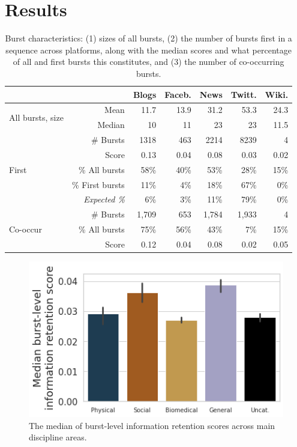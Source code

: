 \documentclass[letterpaper]{article} %
\begin{document}
\section{Results}

\begin{table}[t]
\centering
\begin{tabular}{@{}l |r | r r r r r @{}}
& & Blogs & Faceb. & News & Twitt. & Wiki. \\
\hline
\multirow{2}{7em}{All bursts, size} & Mean & 11.7 & 13.9 & 31.2 & 53.3 & 24.3 \\
& Median & 10 & 11 & 23 & 23 & 11.5 \\
\hline
\hline
\multirow{5}{7em}{First} & \# Bursts & 1318 & 463 & 2214 & 8239 & 4\\
\cline{2-7}
& Score & 0.13 & 0.04 & 0.08 & 0.03 & 0.02 \\
\cline{2-7}
& \% All bursts & 58\% & 40\% & 53\% & 28\% & 15\% \\
\cline{2-7}
& \% First bursts & 11\% & 4\% & 18\% & 67\% & 0\% \\
& \textit{Expected \%} & 6\% & 3\% & 11\% & 79\% & 0\% \\
\hline
\hline
\multirow{3}{7em}{Co-occur} & \# Bursts & 1,709 & 653 & 1,784 & 1,933 & 4\\
& \% All bursts & 75\% & 56\% & 43\% & 7\% & 15\% \\
\cline{2-7}
& Score & 0.12 & 0.04 & 0.08 & 0.02 & 0.05 \\
\end{tabular}
\caption{Burst characteristics: (1) sizes of all bursts, (2) the number of bursts first in a sequence across platforms, along with the median scores and what percentage of all and first bursts this constitutes, and (3) the number of co-occurring bursts.}
\label{tab:first_co_occurring}
\end{table}

\begin{figure}
\centering
\includegraphics[width=0.7\columnwidth]{figs/fig_domains.png}
\caption{The median of burst-level information retention scores across main discipline areas.}
\label{fig:burst_domains}
\end{figure}
\end{document}
